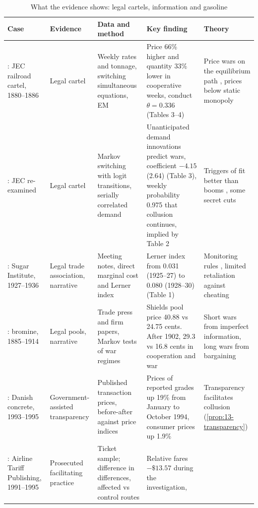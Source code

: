 \begin{table}[htbp]
\centering
\caption{What the evidence shows: legal cartels, information and gasoline}\label{tab:13-synthesis}
\scriptsize
\begin{tabularx}{\textwidth}{@{}>{\raggedright\arraybackslash}p{2.35cm}>{\raggedright\arraybackslash}p{1.7cm}>{\raggedright\arraybackslash}p{2.75cm}>{\raggedright\arraybackslash}X>{\raggedright\arraybackslash}p{3.0cm}@{}}
\toprule
Case & Evidence & Data and method & Key finding & Theory\\
\midrule
\citet{Porter1983}: JEC railroad cartel, 1880--1886 & Legal cartel & Weekly rates and tonnage, switching simultaneous
equations, EM & Price 66\% higher and quantity 33\% lower in cooperative weeks, conduct $\theta = 0.336$ (Tables
3--4) & Price wars on the equilibrium path \citep{GreenPorter1984}, prices below static monopoly\\
\addlinespace
\citet{Ellison1994}: JEC re-examined & Legal cartel & Markov switching with logit transitions, serially correlated
demand & Unanticipated demand innovations predict wars, coefficient $-4.15$ (2.64) (Table 3), weekly probability
0.975 that collusion continues, implied by Table 2 & Triggers of \citet{GreenPorter1984} fit better than booms
\citep{RotembergSaloner1986}, some secret cuts\\
\addlinespace
\citet{GenesoveMullin2001}: Sugar Institute, 1927--1936 & Legal trade association, narrative & Meeting notes, direct
marginal cost and Lerner index & Lerner index from 0.031 (1925--27) to 0.080 (1928--30) (Table 1) & Monitoring rules
\citep{Stigler1964}, limited retaliation against cheating\\
\addlinespace
\citet{Levenstein1997}: bromine, 1885--1914 & Legal pools, narrative & Trade press and firm papers, Markov tests of
war regimes & Shields pool price 40.88 vs 24.75 cents. After 1902, 29.3 vs 16.8 cents in cooperation and war & Short
wars from imperfect information, long wars from bargaining\\
\addlinespace
\citet{AlbaekMollgaardOvergaard1997}: Danish concrete, 1993--1995 & Government-assisted transparency & Published
transaction prices, before-after against price indices & Prices of reported grades up 19\% from January to October
1994, consumer prices up 1.9\% & Transparency facilitates collusion (\cref{prop:13-transparency})\\
\addlinespace
\citet{Miller2010}: Airline Tariff Publishing, 1991--1995 & Prosecuted facilitating practice & Ticket sample;
difference in differences, affected vs control routes & Relative fares $-\$13.57$ during the investigation,

\end{tabularx}
\end{table}

